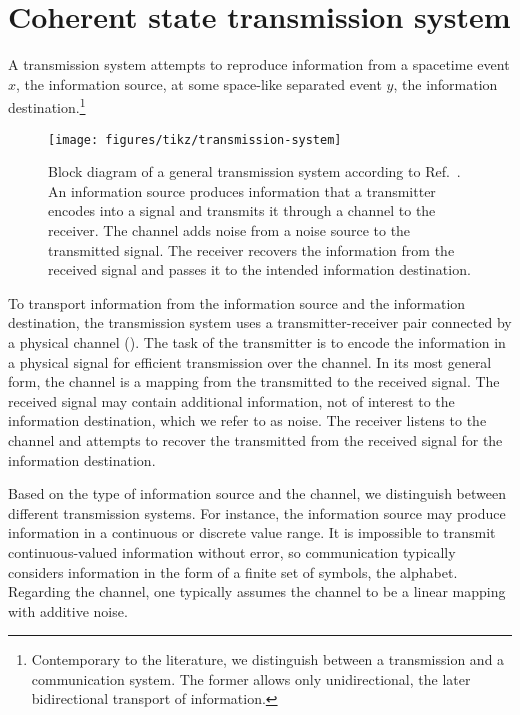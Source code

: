 \chapter{Coherent state transmission system}



A transmission system attempts to reproduce information from a spacetime event $x$, the information source, at some space-like separated event $y$, the information destination.\footnote{Contemporary to the literature, we distinguish between a transmission and a communication system. The former allows only unidirectional, the later bidirectional transport of information.}
\begin{figure}[htb]
	\centering
	\texttt{[image: figures/tikz/transmission-system]}
	\caption{Block diagram of a general transmission system according to Ref.~\cite{Shannon1948}. An information source produces information that a transmitter encodes into a signal and transmits it through a channel to the receiver. The channel adds noise from a noise source to the transmitted signal. The receiver recovers the information from the received signal and passes it to the intended information destination.}\label{fig:transmission_system}
\end{figure}
To transport information from the information source and the information destination, the transmission system uses a transmitter-receiver pair connected by a physical channel ().
The task of the transmitter is to encode the information in a physical signal for efficient transmission over the channel.
In its most general form, the channel is a mapping from the transmitted to the received signal.
The received signal may contain additional information, not of interest to the information destination, which we refer to as noise.
The receiver listens to the channel and attempts to recover the transmitted from the received signal for the information destination.

Based on the type of information source and the channel, we distinguish between different transmission systems.
For instance, the information source may produce information in a continuous or discrete value range.
It is impossible to transmit continuous-valued information without error, so communication typically considers information in the form of a finite set of symbols, the alphabet.
Regarding the channel, one typically assumes the channel to be a linear mapping with additive noise.

